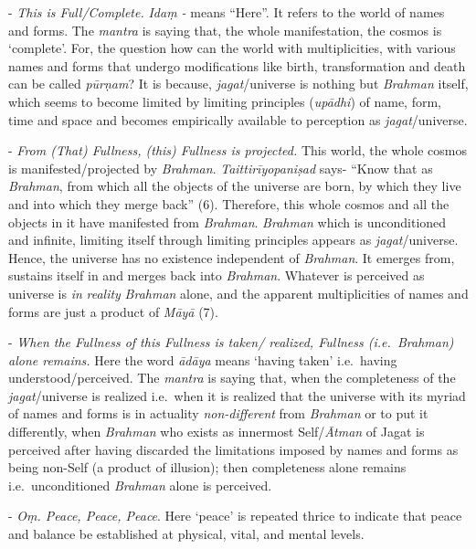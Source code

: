 - \emph{This is Full/Complete.} \emph{Idaṃ -} means ``Here''. It refers to the world of names and forms. The \emph{mantra} is saying that, the whole manifestation, the cosmos is `complete'. For, the question how can the world with multiplicities, with various names and forms that undergo modifications like birth, transformation and death can be called \emph{pūrṇam}? It is because, \emph{jagat}/universe is nothing but \emph{Brahman} itself, which seems to become limited by limiting principles (\emph{upādhi}) of name, form, time and space and becomes empirically available to perception as \emph{jagat}/universe.

- \emph{From (That) Fullness, (this) Fullness is projected.} This world, the whole cosmos is manifested/projected by \emph{Brahman}. \emph{Taittirīyopaniṣad} says- ``Know that as \emph{Brahman}, from which all the objects of the universe are born, by which they live and into which they merge back'' (6). Therefore, this whole cosmos and all the objects in it have manifested from \emph{Brahman}. \emph{Brahman} which is unconditioned and infinite, limiting itself through limiting principles appears as \emph{jagat}/universe. Hence, the universe has no existence independent of \emph{Brahman}. It emerges from, sustains itself in and merges back into \emph{Brahman}. Whatever is perceived as universe is \emph{in} \emph{reality} \emph{Brahman} alone, and the apparent multiplicities of names and forms are just a product of \emph{Māyā} (7).

- \emph{When the Fullness of this Fullness is taken/ realized, Fullness (i.e.\ Brahman) alone remains.} Here the word \emph{ādāya} means `having taken' i.e.\ having understood/perceived. The \emph{mantra} is saying that, when the completeness of the \emph{jagat}/universe is realized i.e.\ when it is realized that the universe with its myriad of names and forms is in actuality \emph{non-different} from \emph{Brahman} or to put it differently, when \emph{Brahman} who exists as innermost Self/\emph{Ātman} of Jagat is perceived after having discarded the limitations imposed by names and forms as being non-Self (a product of illusion); then completeness alone remains i.e.\ unconditioned \emph{Brahman} alone is perceived.

- \emph{Oṃ. Peace, Peace, Peace}. Here `peace' is repeated thrice to indicate that peace and balance be established at physical, vital, and mental levels.

